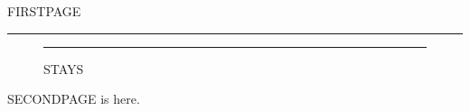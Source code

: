 \documentclass[a4paper]{memoir}
\begin{document}
FIRSTPAGE \marginpar{\rule{2cm}{6cm}}\marginpar{\rule{2cm}{6cm}}%
\marginpar{\rule{2cm}{6cm}} \lipsum[1][1-3]
\begin{marginfigure}
  \rule{2cm}{3cm}
  \caption{MOVED}
\end{marginfigure}
\lipsum[2][1-3]

\begin{figure}[h]
  \centering
  \rule{3cm}{1cm}
  \caption{STAYS}
\end{figure}
\lipsum[3][1-3]
\clearpage
SECONDPAGE is here.
\end{document}
